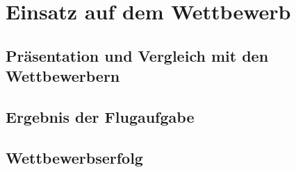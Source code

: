 \chapter{Einsatz auf dem Wettbewerb}\label{cha:Einsatz auf dem Wettbewerb}

\section{Präsentation und Vergleich mit den Wettbewerbern}

\section{Ergebnis der Flugaufgabe}

\section{Wettbewerbserfolg}

